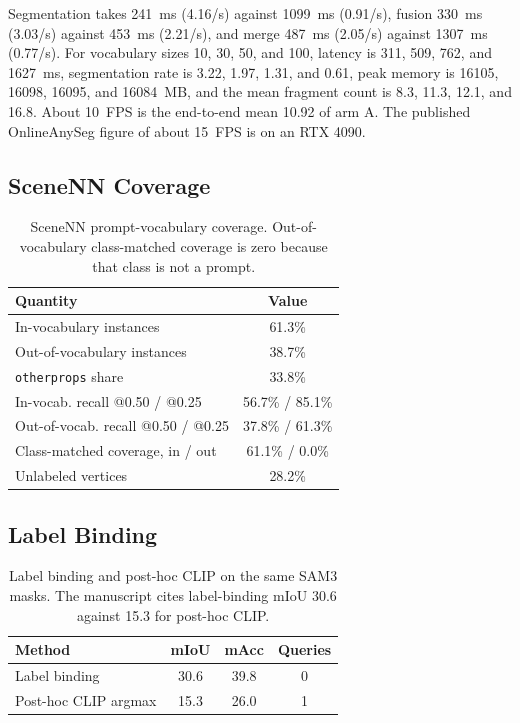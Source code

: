 \documentclass[10pt,letterpaper]{article}
\begin{document}
\noindent
Segmentation takes 241~ms (4.16/s) against 1099~ms (0.91/s), fusion 330~ms (3.03/s) against 453~ms (2.21/s), and merge 487~ms (2.05/s) against 1307~ms (0.77/s).
For vocabulary sizes 10, 30, 50, and 100, latency is 311, 509, 762, and 1627~ms, segmentation rate is 3.22, 1.97, 1.31, and 0.61, peak memory is 16105, 16098, 16095, and 16084~MB, and the mean fragment count is 8.3, 11.3, 12.1, and 16.8.
About 10~FPS is the end-to-end mean 10.92 of arm A.
The published OnlineAnySeg figure of about 15~FPS is on an RTX 4090.

\subsection{SceneNN Coverage}
\begin{table}[H]
\centering
\caption{SceneNN prompt-vocabulary coverage.
Out-of-vocabulary class-matched coverage is zero because that class is not a prompt.}
\label{tab:scenenn}
\begin{tabular}{lc}
\toprule
Quantity & Value \\
\midrule
In-vocabulary instances & 61.3\% \\
Out-of-vocabulary instances & 38.7\% \\
\texttt{otherprops} share & 33.8\% \\
In-vocab. recall @0.50 / @0.25 & 56.7\% / 85.1\% \\
Out-of-vocab. recall @0.50 / @0.25 & 37.8\% / 61.3\% \\
Class-matched coverage, in / out & 61.1\% / 0.0\% \\
Unlabeled vertices & 28.2\% \\
\bottomrule
\end{tabular}
\end{table}

\subsection{Label Binding}
\begin{table}[H]
\centering
\caption{Label binding and post-hoc CLIP on the same SAM3 masks.
The manuscript cites label-binding mIoU 30.6 against 15.3 for post-hoc CLIP.}
\label{tab:bind}
\begin{tabular}{lccc}
\toprule
Method & mIoU & mAcc & Queries \\
\midrule
Label binding & 30.6 & 39.8 & 0 \\
Post-hoc CLIP argmax & 15.3 & 26.0 & 1 \\
\bottomrule
\end{tabular}
\end{table}
\end{document}
